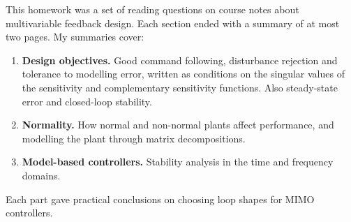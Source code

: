 


This homework was a set of reading questions on course notes about multivariable feedback design. Each section ended with a summary of at most two pages. My summaries cover:
\begin{enumerate}
  \item \textbf{Design objectives.} Good command following, disturbance rejection and tolerance to modelling error, written as conditions on the singular values of the sensitivity and complementary sensitivity functions. Also steady-state error and closed-loop stability.
  \item \textbf{Normality.} How normal and non-normal plants affect performance, and modelling the plant through matrix decompositions.
  \item \textbf{Model-based controllers.} Stability analysis in the time and frequency domains.
\end{enumerate}
Each part gave practical conclusions on choosing loop shapes for MIMO controllers.

